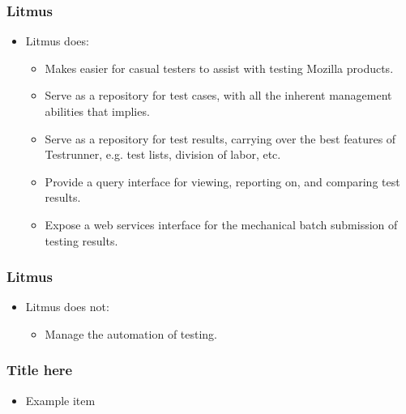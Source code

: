 \documentclass{beamer}
\begin{document}
\begin{frame}
\frametitle{Litmus}
 \begin{itemize}
    \item Litmus does:
       \begin{itemize}
       \item Makes easier for casual testers to assist with testing Mozilla products.
       \item Serve as a repository for test cases, with all the inherent management abilities that implies.
       \item Serve as a repository for test results, carrying over the best features of Testrunner, e.g. test lists, division of labor, etc.
       \item Provide a query interface for viewing, reporting on, and comparing test results.
       \item Expose a web services interface for the mechanical batch submission of testing results.
       \end{itemize}
 \end{itemize}
\end{frame}


\begin{frame}
\frametitle{Litmus}
 \begin{itemize}
    \item Litmus does not:
       \begin{itemize}
       \item Manage the automation of testing.
       \end{itemize}
 \end{itemize}

\end{frame}



\begin{frame}
\frametitle{Title here}
 \begin{itemize}
   \item Example item
 \end{itemize}
\end{frame}

\end{document}

